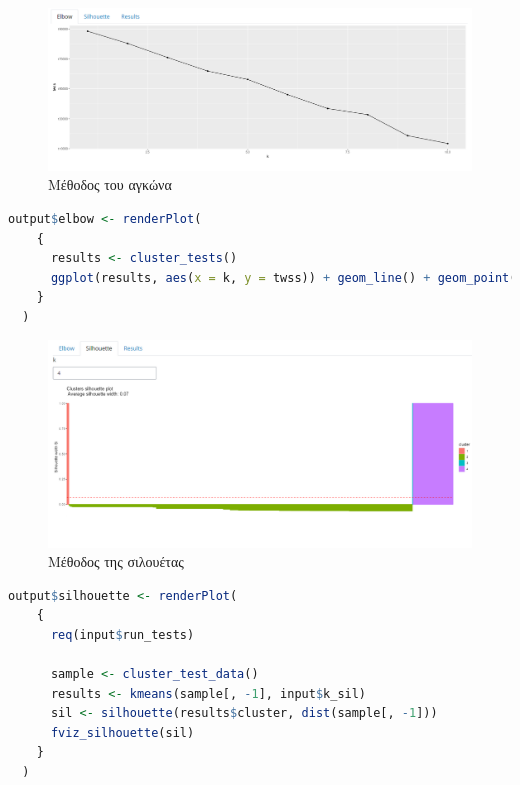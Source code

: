 \documentclass{article}
\begin{document}
\newpage

\begin{figure}[h]
    \centering
    \includegraphics[width=\textwidth]{pictures/15_elbow_method.png}
    \caption{Μέθοδος του αγκώνα}
    \label{fig:15}
\end{figure}

\begin{lstlisting}[language=R, caption=Κώδικας για τη μέθοδο του αγκώνα, label={snippet:7}]
output$elbow <- renderPlot(
    {
      results <- cluster_tests()
      ggplot(results, aes(x = k, y = twss)) + geom_line() + geom_point()
    }
  )
\end{lstlisting}

\begin{figure}[h]
    \centering
    \includegraphics[width=\textwidth]{pictures/16_silhouette_method.png}
    \caption{Μέθοδος της σιλουέτας}
    \label{fig:16}
\end{figure}

\newpage

\begin{lstlisting}[language=R, caption=Κώδικας για τη μέθοδο της σιλουέτας, label={snippet:8}]
output$silhouette <- renderPlot(
    {
      req(input$run_tests)

      sample <- cluster_test_data()
      results <- kmeans(sample[, -1], input$k_sil)
      sil <- silhouette(results$cluster, dist(sample[, -1]))
      fviz_silhouette(sil)
    }
  )
\end{lstlisting}
\end{document}
